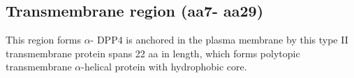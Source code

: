 \subsection{Transmembrane region (aa7- aa29)}

This region forms $\alpha$- 
DPP4 is anchored in the plasma membrane by this type II transmembrane protein spans 22 aa in length, which forms polytopic transmembrane $\alpha$-helical protein with hydrophobic core.~\cite{Hong_1990} 
